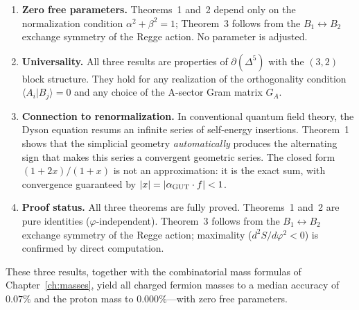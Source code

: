 \begin{enumerate}
\item \textbf{Zero free parameters.}
Theorems~1 and~2 depend only on the normalization condition
$\alpha^2 + \beta^2 = 1$; Theorem~3 follows from the $B_1 \leftrightarrow B_2$
exchange symmetry of the Regge action.  No parameter is adjusted.

\item \textbf{Universality.}
All three results are properties of $\partial(\Delta^5)$ with the
$(3,2)$ block structure.  They hold for any realization of the
orthogonality condition $\langle A_i | B_j \rangle = 0$ and any
choice of the A-sector Gram matrix $G_A$.

\item \textbf{Connection to renormalization.}
In conventional quantum field theory, the Dyson equation resums an
infinite series of self-energy insertions.  Theorem~1 shows that the
simplicial geometry \emph{automatically} produces the alternating sign
that makes this series a convergent geometric series.  The closed form
$(1+2x)/(1+x)$ is not an approximation: it is the exact sum, with
convergence guaranteed by $|x| = |\alpha_{\mathrm{GUT}} \cdot f| < 1$.

\item \textbf{Proof status.}
All three theorems are fully proved.  Theorems~1 and~2 are pure identities ($\varphi$-independent).  Theorem~3 follows from the $B_1 \leftrightarrow B_2$ exchange symmetry of the Regge action; maximality ($d^2S/d\varphi^2 < 0$) is confirmed by direct computation.
\end{enumerate}

These three results, together with the combinatorial mass formulas of
Chapter~\ref{ch:masses}, yield all charged fermion masses to a median
accuracy of $0.07\%$ and the proton mass to $0.000\%$---with zero
free parameters.
